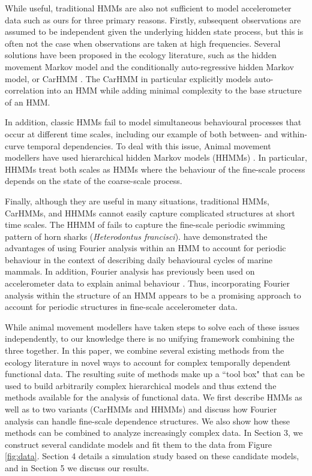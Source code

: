 While useful, traditional HMMs are also not sufficient to model accelerometer data such as ours for three primary reasons.
Firstly, subsequent observations are assumed to be independent given the underlying hidden state process, but this is often not the case when observations are taken at high frequencies. Several solutions have been proposed in the ecology literature, such as the hidden movement Markov model \citep{Whoriskey:2016} and the conditionally auto-regressive hidden Markov model, or CarHMM \citep{Lawler:2019}. The CarHMM in particular explicitly models auto-correlation into an HMM while adding minimal complexity to the base structure of an HMM. 

In addition, classic HMMs fail to model simultaneous behavioural processes that occur at different time scales, including our example of both between- and within-curve temporal dependencies. To deal with this issue, Animal movement modellers have used hierarchical hidden Markov models (HHMMs) \citep{Barajas:2017,Adam:2019}. In particular, HHMMs treat both scales as HMMs where the behaviour of the fine-scale process depends on the state of the coarse-scale process.

Finally, although they are useful in many situations, traditional HMMs, CarHMMs, and HHMMs cannot easily capture complicated structures at short time scales. The HHMM of \citet{Adam:2019} fails to capture the fine-scale periodic swimming pattern of horn sharks (\textit{Heterodontus francisci}). \citet{Heerah:2017} have demonstrated the advantages of using Fourier analysis within an HMM to account for periodic behaviour in the context of describing daily behavioural cycles of marine mammals. In addition, Fourier analysis has previously been used on accelerometer data to explain animal behaviour \citep{Fehlmann:2017,Shorter:2017}. Thus, incorporating Fourier analysis within the structure of an HMM appears to be a promising approach to account for periodic structures in fine-scale accelerometer data.

While animal movement modellers have taken steps to solve each of these issues independently, to our knowledge there is no unifying framework combining the three together. In this paper, we combine several existing methods from the ecology literature in novel ways to account for complex temporally dependent functional data. The resulting suite of methods make up a ``tool box" that can be used to build arbitrarily complex hierarchical models and thus extend the methods available for the analysis of functional data. We first describe HMMs as well as to two variants (CarHMMs and HHMMs) and discuss how Fourier analysis can handle fine-scale dependence structures. We also show how these methods can be combined to analyze increasingly complex data. In Section 3, we construct several candidate models and fit them to the data from Figure \ref{fig:data}. Section 4 details a simulation study based on these candidate models, and in Section 5 we discuss our results.